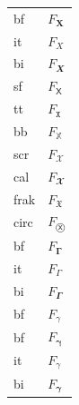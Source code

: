 \documentclass[varwidth]{unittest}
\begin{document}
\begin{tabular}{ll}
\\ bf    & $F_𝐗$
\\ it    & $F_𝑋$
\\ bi    & $F_𝑿$
\\ sf    & $F_𝖷$
\\ tt    & $F_𝚇$
\\ bb    & $F_𝕏$
\\ scr   & $F_𝒳$
\\ cal   & $F_𝓧$
\\ frak  & $F_𝔛$
\\ circ  & $F_Ⓧ$
\\ bf    & $F_𝚪$
\\ it    & $F_𝛤$
\\ bi    & $F_𝜞$
\\ bf    & $F_γ$
\\ bf    & $F_𝛄$
\\ it    & $F_𝛾$
\\ bi    & $F_𝜸$
\end{tabular}
\end{document}

